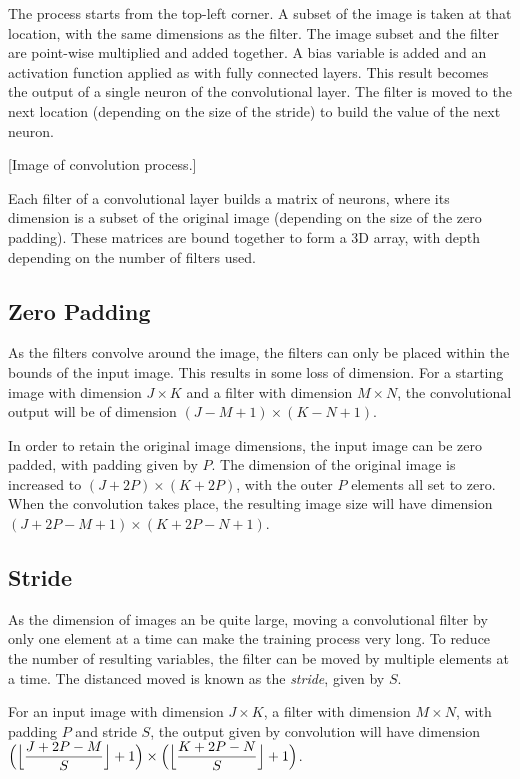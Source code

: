 The process starts from the top-left corner. A subset of the image is taken at that location, with the same dimensions as the filter. The image subset and the filter are point-wise multiplied and added together. A bias variable is added and an activation function applied as with fully connected layers. This result becomes the output of a single neuron of the convolutional layer. The filter is moved to the next location (depending on the size of the stride) to build the value of the next neuron.

[Image of convolution process.]

Each filter of a convolutional layer builds a matrix of neurons, where its dimension is a subset of the original image (depending on the size of the zero padding). These matrices are bound together to form a 3D array, with depth depending on the number of filters used.

\subsection{Zero Padding}\label{convnets-pad}

As the filters convolve around the image, the filters can only be placed within the bounds of the input image. This results in some loss of dimension. For a starting image with dimension $J \times K$ and a filter with dimension $M \times N$, the convolutional output will be of dimension $(J - M + 1)\times (K - N + 1)$.

In order to retain the original image dimensions, the input image can be zero padded, with padding given by $P$. The dimension of the original image is increased to $(J+2P) \times (K+2P)$, with the outer $P$ elements all set to zero. When the convolution takes place, the resulting image size will have dimension $(J+2P - M + 1) \times (K + 2P - N + 1)$.

\subsection{Stride}\label{convnets-stride}

As the dimension of images an be quite large, moving a convolutional filter by only one element at a time can make the training process very long. To reduce the number of resulting variables, the filter can be moved by multiple elements at a time. The distanced moved is known as the \textit{stride}, given by $S$.

For an input image with dimension $J \times K$, a filter with dimension $M \times N$, with padding $P$ and stride $S$, the output given by convolution will have dimension $\Big(\Bigl\lfloor \dfrac{J + 2P - M}{S}\Bigr\rfloor + 1\Big) \times \Big(\Bigl\lfloor \dfrac{K + 2P - N}{S} \Bigr\rfloor + 1\Big)$.

